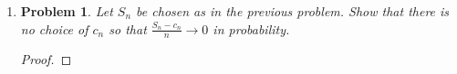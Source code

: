 \documentclass[a4paper]{article}
\newtheorem*{problem}{Problem}
\newcommand{\E}{\mathbb{E}}
\begin{document}
\begin{enumerate}
\begin{proof}
      Therefore,
      \[ \frac{1}{n^2 \log^2 n} n \E[ \bar{X_n}^2 ] = \frac{2}{\log n} \to 0, \]
      and (ii) from the theorem is satisfied.

    \end{proof}

  \item
    \begin{problem}
      Let $S_n$ be chosen as in the previous problem. Show that there is no choice of $c_n$ so that $\frac{S_n - c_n}{n} \to 0$ in probability.
    \end{problem}

    \begin{proof}

    \end{proof}

\end{enumerate}
\end{document}
